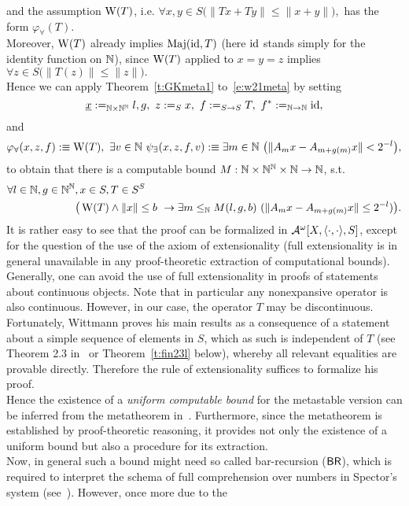 and the assumption $\operatorname{W}(T)$, i.e.
$
\forall x,y\in S \big(\| Tx + Ty \| \leq \|x + y\|\big),
$
has the form $\varphi_\forall(T)$.\\
Moreover, $\operatorname{W}(T)$ already implies $\operatorname{Maj}(\operatorname{id},T)$ (here $\operatorname{id}$ stands 
simply for the identity function on $\mathbb{N}$), since $\operatorname{W}(T)$ applied to $x=y=z$
implies
$
\forall z\in S \big( \|T(z)\| \leq \|z\| \big).
$\\
Hence we can apply Theorem~\ref{t:GKmeta1} to~\eqref{e:w21meta} by setting
\[
\underline x:=_{\mathbb{N}\times\mathbb{N}^{\mathbb{N}}} l,g,
\ z:=_{S}x,
\ f:=_{S\to S}T,
\ f^*:=_{\mathbb{N}\to \mathbb{N}}\operatorname{id},
\] and
\[
\varphi_\forall(x, z, f):\equiv\TAN(T),\ 
\exists v\in\NN\ \psi_\exists(x, z, f, v):\equiv\exists m\in\NN\ \big( \|A_mx-A_{m+g(m)}x\| < 2^{-l}\big),
\]
to obtain that there is a computable bound $M:\mathbb{N}\times\mathbb{N}^{\mathbb{N}}\times\mathbb{N}\to\mathbb{N}$, s.t.
\begin{align*}
\forall l\in\mathbb{N},g\in\mathbb{N}^{\mathbb{N}}&, x\in S, T\in S^S \\
&\big( \operatorname{W}(T) \wedge \|x\| \leq b\ \rightarrow \exists m\leq_{\mathbb{N}} M(l,g,b)\ ( \|A_mx-A_{m+g(m)}x\|\leq 2^{-l}) \big). 
\end{align*}
It is rather easy to see that the proof can be formalized in $\mathcal{A}^\omega[X,\langle\cdot,\cdot\rangle,S]$, except for the question of the use
of the axiom of extensionality (full extensionality
is in general unavailable in any proof-theoretic extraction of computational bounds). 
Generally, one can avoid the use of full extensionality in proofs of statements
about continuous objects. Note that in particular any nonexpansive operator
is also continuous. However, in our case, the operator $T$ may be discontinuous. 
Fortunately, Wittmann proves his main results as a consequence of
a statement about a simple sequence of elements in $S$, 
which as such is independent of $T$ (see Theorem 2.3 in~\cite{Wittmann90} or Theorem~\ref{t:fin23l} below),
whereby all relevant equalities are provable directly. Therefore the rule of extensionality
suffices to formalize his proof.\\
Hence the existence of a {\em uniform computable bound} for the metastable version
can be inferred from the metatheorem in~\cite{GK08}. Furthermore, since the metatheorem is established
by proof-theoretic reasoning, it provides not only the existence of a uniform bound but also
a procedure for its extraction.\\
Now, in general such a bound might need so called
bar-recursion ($\textsf{\upshape BR}$), which is required to interpret the schema of full comprehension over numbers
in Spector's system (see~\cite{Spector62}). However, once more due to the
